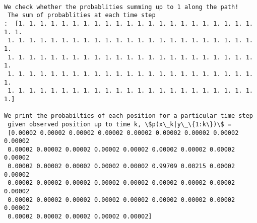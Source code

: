 \documentclass[11pt]{article}
\begin{document}
    \begin{Verbatim}[commandchars=\\\{\}]

We check whether the probablities summing up to 1 along the path! 
 The sum of probablities at each time step 
:  [1. 1. 1. 1. 1. 1. 1. 1. 1. 1. 1. 1. 1. 1. 1. 1. 1. 1. 1. 1. 1. 1. 1. 1.
 1. 1. 1. 1. 1. 1. 1. 1. 1. 1. 1. 1. 1. 1. 1. 1. 1. 1. 1. 1. 1. 1. 1. 1.
 1. 1. 1. 1. 1. 1. 1. 1. 1. 1. 1. 1. 1. 1. 1. 1. 1. 1. 1. 1. 1. 1. 1. 1.
 1. 1. 1. 1. 1. 1. 1. 1. 1. 1. 1. 1. 1. 1. 1. 1. 1. 1. 1. 1. 1. 1. 1. 1.
 1. 1. 1. 1. 1. 1. 1. 1. 1. 1. 1. 1. 1. 1. 1. 1. 1. 1. 1. 1. 1. 1. 1. 1.]

We print the probabilties of each position for a particular time step 
 given observed position up to time k, \$p(x\_k|y\_\{1:k\})\$ =  
 [0.00002 0.00002 0.00002 0.00002 0.00002 0.00002 0.00002 0.00002 0.00002
 0.00002 0.00002 0.00002 0.00002 0.00002 0.00002 0.00002 0.00002 0.00002
 0.00002 0.00002 0.00002 0.00002 0.00002 0.99709 0.00215 0.00002 0.00002
 0.00002 0.00002 0.00002 0.00002 0.00002 0.00002 0.00002 0.00002 0.00002
 0.00002 0.00002 0.00002 0.00002 0.00002 0.00002 0.00002 0.00002 0.00002
 0.00002 0.00002 0.00002 0.00002 0.00002]

    \end{Verbatim}
\end{document}
